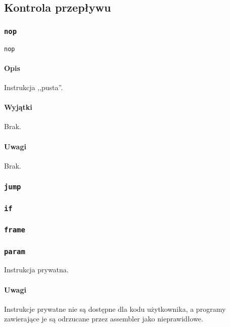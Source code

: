 \subsection{Kontrola przepływu}
\label{viua_vm_ops_control_flow}

\subsubsection{\texttt{nop}}

\begin{lstlisting}
nop
\end{lstlisting}

\paragraph*{Opis} Instrukcja ,,pusta''.

\paragraph*{Wyjątki} Brak.

\paragraph*{Uwagi} Brak.

\subsubsection{\texttt{jump}}
\subsubsection{\texttt{if}}

\subsubsection{\texttt{frame}}
\subsubsection{\texttt{param}}

Instrukcja prywatna.

\paragraph*{Uwagi}

Instrukcje prywatne nie są dostępne dla kodu użytkownika, a programy zawierające
je są odrzucane przez assembler jako nieprawidłowe.

